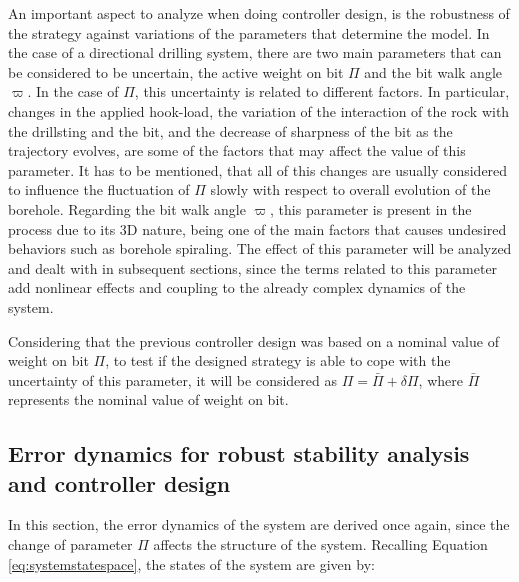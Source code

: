 \documentclass[main.tex]{subfiles}
\begin{document}
An important aspect to analyze when doing controller design, is the robustness of the strategy against variations of the parameters that determine the model. In the case of a directional drilling system, there are two main parameters that can be considered to be uncertain, the active weight on bit $\Pi$ and the bit walk angle $\varpi$. In the case of $\Pi$, this uncertainty is related to different factors. In particular, changes in the applied hook-load, the variation of the interaction of the rock with the drillsting and the bit, and the decrease of sharpness of the bit as the trajectory evolves, are some of the factors that may affect the value of this parameter. It has to be mentioned, that all of this changes are usually considered to influence the fluctuation of $\Pi$ slowly with respect to overall evolution of the borehole. Regarding the bit walk angle $\varpi$, this parameter is  present in the process due to its 3D nature, being one of the main factors that causes undesired behaviors such as borehole spiraling. The effect of this parameter will be analyzed and dealt with in subsequent sections, since the terms related to this parameter add nonlinear effects and coupling to the already complex dynamics of the system. 

Considering that the previous controller design was based on a nominal value of weight on bit $\Pi$, to test if the designed strategy is able to cope with the uncertainty of this parameter, it will be considered as $\Pi = \bar{\Pi} + \delta\Pi$, where $\bar{\Pi}$ represents the nominal value of weight on bit.

\subsection{Error dynamics for robust stability analysis and controller design}

In this section, the error dynamics of the system are derived once again, since the change of parameter $\Pi$ affects the structure of the system. Recalling Equation \eqref{eq:systemstatespace}, the states of the system are given by:
\end{document}
